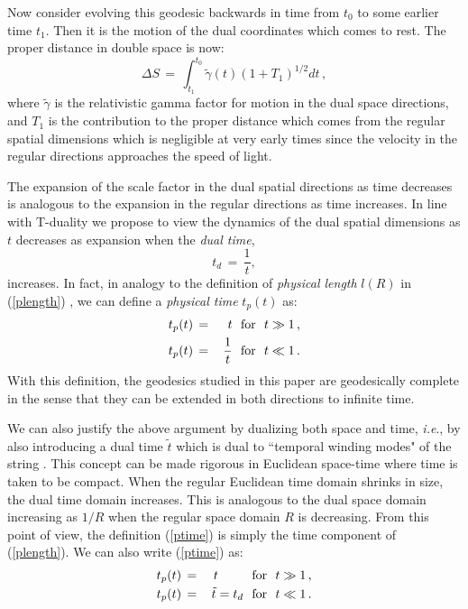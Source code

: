 \documentclass[prd, aps, superscriptaddress, preprintnumbers, twocolumn, floatfix, nofootinbib]{revtex4}
\begin{document}
Now consider evolving this geodesic backwards in time from $t_0$ to some
earlier time $t_1$. Then it is the motion of the dual coordinates which comes
to rest. The proper distance in double space is now:
\begin{equation}
\Delta S \, = \, \int_{t_1}^{t_0} {\tilde{\gamma}}(t) (1 + T_1)^{1/2} dt  \, ,
\end{equation}
where ${\tilde{\gamma}}$ is the relativistic gamma factor for motion in
the dual space directions, and $T_1$ is the contribution to the proper distance
which comes from the regular spatial dimensions which is negligible at
very early times since the velocity in the regular directions approaches the
speed of light.

The expansion of the scale factor in the dual spatial directions as time
decreases is analogous to the expansion in the regular directions as
time increases. In line with T-duality we propose to view the dynamics
of the dual spatial dimensions as $t$ decreases as expansion when
the {\it dual time},
\begin{equation}
t_d \, = \, \frac{1}{t},
\end{equation}
increases. In fact, in analogy to the definition of {\it physical length}
$l(R)$ in (\ref{plength}) \cite{BV}, we can define a {\it physical time}
$t_p(t)$ as:
\begin{eqnarray} \label{ptime}
t_p(t) \, &=& \, t  \,\,\,\, {\rm for} \,\,\,\, t \gg 1 \, ,\\
t_p(t) \, &=& \, \frac{1}{t} \,\,\,\, {\rm for} \,\,\,\, t \ll 1 \,  .  \nonumber
\end{eqnarray}
With this definition, the geodesics studied in this paper are
geodesically complete in the sense that they can be extended
in both directions to infinite time.

We can also justify the above argument by dualizing both space
and time, \textit{i.e}., by also introducing a dual time ${\tilde t}$ which is
dual to ``temporal winding modes" of the string \cite{Hull2}. This concept
can be made rigorous in Euclidean space-time where time is
taken to be compact. When the regular Euclidean time domain
shrinks in size, the dual time domain increases. This is analogous
to the dual space domain increasing as $1/R$ when the regular
space domain $R$ is decreasing.  From this point of view, the
definition (\ref{ptime}) is simply the time component of (\ref{plength}).
We can also write (\ref{ptime}) as:
\begin{eqnarray} \label{ptime2}
t_p(t) \, &=& \, t  \,\,\,\, \,\,\,\,\, \,\,\,\, \,\,\, {\rm for} \,\,\,\, t \gg 1 \, ,\\
t_p(t) \, &=& \, {\tilde t} = t_d \,\,\,\, {\rm for} \,\,\,\, t \ll 1 \,  .  \nonumber
\end{eqnarray}
\end{document}
